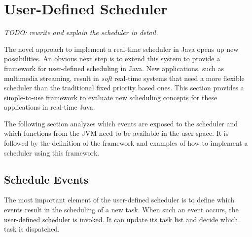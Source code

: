 \section{User-Defined Scheduler}
\label{sec:usersched}

\emph{TODO: rewrite and explain the scheduler in detail.}

The novel approach to implement a real-time scheduler in Java opens
up new possibilities. An obvious next step is to extend this system
to provide a framework for user-defined scheduling in Java. New
applications, such as multimedia streaming, result in \emph{soft}
real-time systems that need a more flexible scheduler than the
traditional fixed priority based ones. This section provides a
simple-to-use framework to evaluate new scheduling concepts for
these applications in real-time Java.

The following section analyzes which events are exposed to the
scheduler and which functions from the JVM need to be available in
the user space. It is followed by the definition of the framework
and examples of how to implement a scheduler using this framework.

\subsection{Schedule Events}

The most important element of the user-defined scheduler is to
define which events result in the scheduling of a new task. When
such an event occurs, the user-defined scheduler is invoked. It can
update its task list and decide which task is dispatched.


